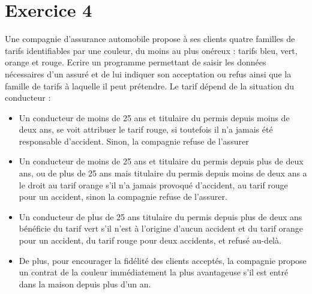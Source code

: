 \documentclass{article}
\begin{document}
	\section*{Exercice 4}
		Une compagnie d'assurance automobile propose à ses clients quatre familles de tarifs identifiables par une couleur, du moins au plus onéreux : tarifs bleu, vert, orange et rouge. Ecrire un programme permettant 
		de saisir les données nécessaires d'un assuré et de lui indiquer son acceptation ou refus ainsi que la famille de tarifs à laquelle il peut prétendre. Le tarif dépend de la situation du conducteur :
		\begin{itemize}
			\item Un conducteur de moins de 25 ans et titulaire du permis depuis moins de deux ans, se voit attribuer le tarif rouge, si toutefois il n'a jamais été responsable d'accident. Sinon, la compagnie refuse de l'assurer
			\item Un conducteur de moins de 25 ans et titulaire du permis depuis plus de deux ans, ou de plus de 25 ans mais titulaire du permis depuis moins de deux ans a le droit au tarif orange s'il n'a jamais provoqué 
				d'accident, au tarif rouge pour un accident, sinon la compagnie refuse de l'assurer. 

			\item Un conducteur de plus de 25 ans titulaire du permis depuis plus de deux ans bénéficie du tarif vert s'il n'est à l'origine d'aucun accident et du tarif orange pour un accident, du tarif rouge pour deux accidents,
					 et refusé au-delà.
			\item De plus, pour encourager la fidélité des clients acceptés, la compagnie propose un contrat de la couleur immédiatement la plus avantageuse s'il est entré dans la maison depuis plus d'un an.

		\end{itemize}		
\end{document}
